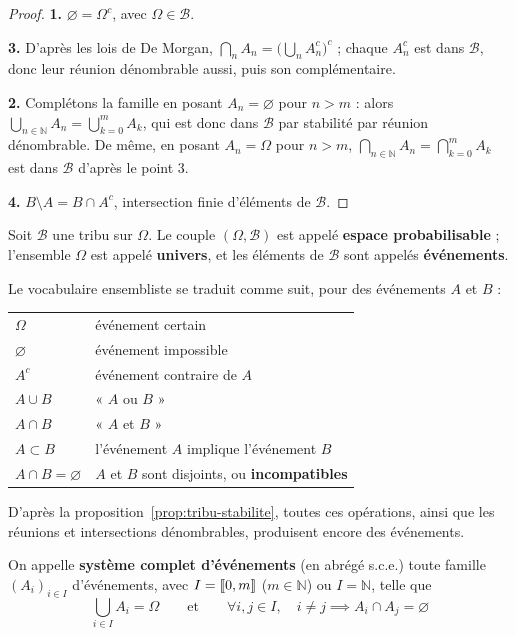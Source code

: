 \begin{proof}
\textbf{1.} $\varnothing=\Omega^c$, avec $\Omega\in\mathcal{B}$.

\textbf{3.} D'après les lois de De Morgan, $\bigcap_nA_n=\big(\bigcup_nA_n^c\big)^c$ ; chaque $A_n^c$ est dans $\mathcal{B}$, donc leur réunion dénombrable aussi, puis son complémentaire.

\textbf{2.} Complétons la famille en posant $A_n=\varnothing$ pour $n>m$ : alors $\bigcup_{n\in\mathbb{N}}A_n=\bigcup_{k=0}^mA_k$, qui est donc dans $\mathcal{B}$ par stabilité par réunion dénombrable. De même, en posant $A_n=\Omega$ pour $n>m$, $\bigcap_{n\in\mathbb{N}}A_n=\bigcap_{k=0}^mA_k$ est dans $\mathcal{B}$ d'après le point 3.

\textbf{4.} $B\setminus A=B\cap A^c$, intersection finie d'éléments de $\mathcal{B}$.
\end{proof}

\begin{defi}
\label{defi:espace-probabilisable}
Soit $\mathcal{B}$ une tribu sur $\Omega$. Le couple $(\Omega,\mathcal{B})$ est appelé \textbf{espace probabilisable} ; l'ensemble $\Omega$ est appelé \textbf{univers}, et les éléments de $\mathcal{B}$ sont appelés \textbf{événements}.
\end{defi}

Le vocabulaire ensembliste se traduit comme suit, pour des événements $A$ et $B$ :
\begin{center}
\begin{tabular}{ll}
$\Omega$ & événement certain \\
$\varnothing$ & événement impossible \\
$A^c$ & événement contraire de $A$ \\
$A\cup B$ & « $A$ ou $B$ » \\
$A\cap B$ & « $A$ et $B$ » \\
$A\subset B$ & l'événement $A$ implique l'événement $B$ \\
$A\cap B=\varnothing$ & $A$ et $B$ sont disjoints, ou \textbf{incompatibles}
\end{tabular}
\end{center}
D'après la proposition~\ref{prop:tribu-stabilite}, toutes ces opérations, ainsi que les réunions et intersections dénombrables, produisent encore des événements.

\begin{defi}
\label{defi:sce}
On appelle \textbf{système complet d'événements} (en abrégé s.c.e.) toute famille $(A_i)_{i\in I}$ d'événements, avec $I=\llbracket 0,m \rrbracket$ ($m\in\mathbb{N}$) ou $I=\mathbb{N}$, telle que
\[\bigcup_{i\in I}A_i=\Omega\qquad\text{et}\qquad\forall i,j\in I,\quad i\neq j\implies A_i\cap A_j=\varnothing\]
\end{defi}

